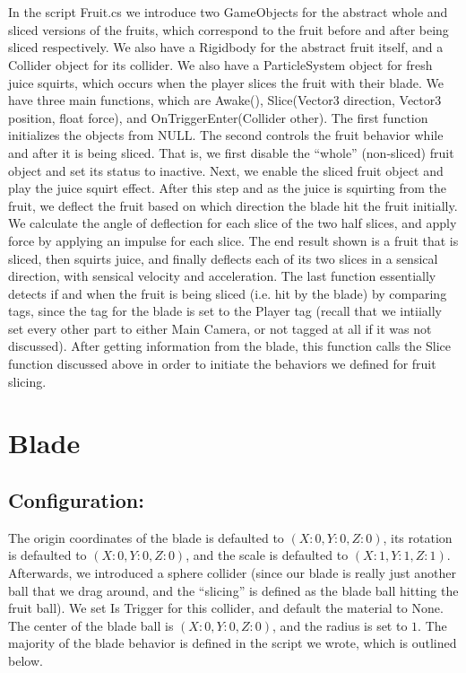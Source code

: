 \\\\
In the script Fruit.cs we introduce two GameObjects for the abstract whole and sliced versions of the fruits, which correspond to the fruit before and after being sliced respectively. 
We also have a Rigidbody for the abstract fruit itself, and a Collider object for its collider. We also have a ParticleSystem object for fresh juice squirts, which occurs when the player 
slices the fruit with their blade. We have three main functions, which are Awake(), Slice(Vector3 direction, Vector3 position, float force), and OnTriggerEnter(Collider other). The first 
function initializes the objects from NULL. The second controls the fruit behavior while and after it is being sliced. That is, we first disable the ``whole'' (non-sliced) fruit object 
and set its status to inactive. Next, we enable the sliced fruit object and play the juice squirt effect. After this step and as the juice is squirting from the fruit, we deflect the fruit 
based on which direction the blade hit the fruit initially. We calculate the angle of deflection for each slice of the two half slices, and apply force by applying an impulse for each slice. 
The end result shown is a fruit that is sliced, then squirts juice, and finally deflects each of its two slices in a sensical direction, with sensical velocity and acceleration. The last 
function essentially detects if and when the fruit is being sliced (i.e. hit by the blade) by comparing tags, since the tag for the blade is set to the Player tag (recall that we intiially 
set every other part to either Main Camera, or not tagged at all if it was not discussed). After getting information from the blade, this function calls the Slice function discussed above 
in order to initiate the behaviors we defined for fruit slicing.

\section{Blade}
\subsection{Configuration:}
The origin coordinates of the blade is defaulted to $(X: 0, Y: 0, Z: 0)$, its rotation is defaulted to $(X: 0, Y: 0, Z: 0)$, and the scale is defaulted to $(X: 1, Y: 1, Z: 1)$. Afterwards, 
we introduced a sphere collider (since our blade is really just another ball that we drag around, and the ``slicing'' is defined as the blade ball hitting the fruit ball). We set Is Trigger 
for this collider, and default the material to None. The center of the blade ball is $(X: 0, Y: 0, Z: 0)$, and the radius is set to $1$. The majority of the blade behavior is defined in the 
script we wrote, which is outlined below.
\\\\
